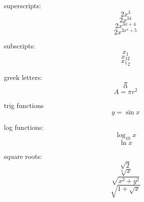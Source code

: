 \documentclass[11pt]{article}
\begin{document}
superscripts: $$2x^3$$
$$2x^{34}$$
$$2x^{3x+4}$$
$$2x^{3x^4+5}$$

subscripts:
$$x_1$$
$$x_{12}$$
$${x_1}_2$$

greek letters:
$$\pi$$
$$\alpha$$
$$A=\pi r^2$$

trig functions
$$y=\sin{x}$$

log functions:
$$\log_{10}{x}$$
$$\ln{x}$$

square roots:
$$\sqrt{2}$$
$$\sqrt[3]{x}$$
$$\sqrt{x^2+y^2}$$
$$\sqrt{1+\sqrt{x}}$$
\end{document}
